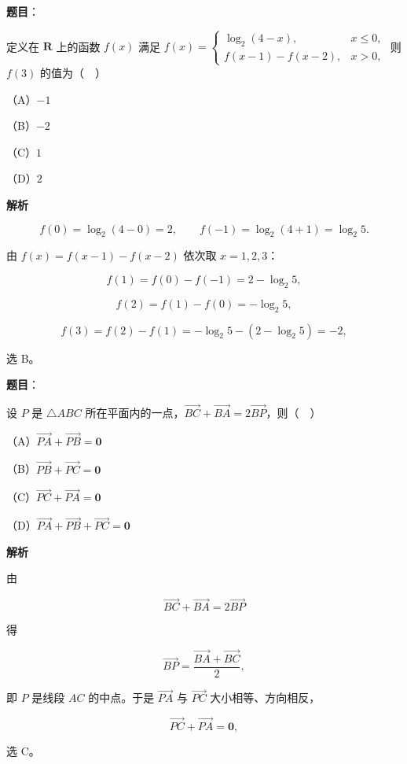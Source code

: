 \begin{answer}

\textbf{题目}：

定义在 $\mathbf R$ 上的函数 $f(x)$ 满足 $f(x)=\begin{cases}\log_2(4-x),&x\leqslant0,\\ f(x-1)-f(x-2),&x>0,\end{cases}$ 则 $f(3)$ 的值为（　）

（A）$-1$

（B）$-2$

（C）$1$

（D）$2$

\textbf{解析}

\nopagebreak[4]
\[f(0)=\log_2(4-0)=2,\qquad f(-1)=\log_2(4+1)=\log_2 5 .\]

由 $f(x)=f(x-1)-f(x-2)$ 依次取 $x=1,2,3$：

\nopagebreak[4]
\[f(1)=f(0)-f(-1)=2-\log_2 5,\]

\nopagebreak[4]
\[f(2)=f(1)-f(0)=-\log_2 5,\]

\nopagebreak[4]
\[f(3)=f(2)-f(1)=-\log_2 5-(2-\log_2 5)=-2,\]

选 B。


\end{answer}
\begin{answer}

\textbf{题目}：

设 $P$ 是 $\triangle ABC$ 所在平面内的一点，$\overrightarrow{BC}+\overrightarrow{BA}=2\overrightarrow{BP}$，则（　）

（A）$\overrightarrow{PA}+\overrightarrow{PB}=\mathbf 0$

（B）$\overrightarrow{PB}+\overrightarrow{PC}=\mathbf 0$

（C）$\overrightarrow{PC}+\overrightarrow{PA}=\mathbf 0$

（D）$\overrightarrow{PA}+\overrightarrow{PB}+\overrightarrow{PC}=\mathbf 0$

\textbf{解析}

由

\nopagebreak[4]
\[\overrightarrow{BC}+\overrightarrow{BA}=2\overrightarrow{BP}\]

得

\nopagebreak[4]
\[\overrightarrow{BP}=\frac{\overrightarrow{BA}+\overrightarrow{BC}}{2},\]

即 $P$ 是线段 $AC$ 的中点。于是 $\overrightarrow{PA}$ 与 $\overrightarrow{PC}$ 大小相等、方向相反，

\nopagebreak[4]
\[\overrightarrow{PC}+\overrightarrow{PA}=\mathbf 0,\]

选 C。


\end{answer}
